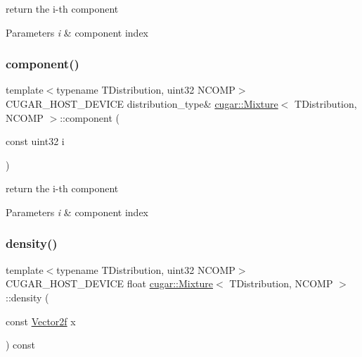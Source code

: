 return the i-\/th component


\begin{DoxyParams}{Parameters}
{\em i} & component index \\
\hline
\end{DoxyParams}
\mbox{\label{structcugar_1_1_mixture_af1cbb67b23fe32e6b1957243b4441ea8}} 
\subsubsection{\texorpdfstring{component()}{component()}\hspace{0.1cm}{\footnotesize\ttfamily [2/2]}}
{\footnotesize\ttfamily template$<$typename T\+Distribution, uint32 N\+C\+O\+MP$>$ \\
C\+U\+G\+A\+R\+\_\+\+H\+O\+S\+T\+\_\+\+D\+E\+V\+I\+CE distribution\+\_\+type\& \hyperlink{structcugar_1_1_mixture}{cugar\+::\+Mixture}$<$ T\+Distribution, N\+C\+O\+MP $>$\+::component (\begin{DoxyParamCaption}\item[{const uint32}]{i }\end{DoxyParamCaption})\hspace{0.3cm}{\ttfamily [inline]}}

return the i-\/th component


\begin{DoxyParams}{Parameters}
{\em i} & component index \\
\hline
\end{DoxyParams}
\mbox{\label{structcugar_1_1_mixture_a8056e27efcefea2005a3b52b8abf751f}} 
\subsubsection{\texorpdfstring{density()}{density()}\hspace{0.1cm}{\footnotesize\ttfamily [1/2]}}
{\footnotesize\ttfamily template$<$typename T\+Distribution, uint32 N\+C\+O\+MP$>$ \\
C\+U\+G\+A\+R\+\_\+\+H\+O\+S\+T\+\_\+\+D\+E\+V\+I\+CE float \hyperlink{structcugar_1_1_mixture}{cugar\+::\+Mixture}$<$ T\+Distribution, N\+C\+O\+MP $>$\+::density (\begin{DoxyParamCaption}\item[{const \hyperlink{structcugar_1_1_vector}{Vector2f}}]{x }\end{DoxyParamCaption}) const\hspace{0.3cm}{\ttfamily [inline]}}

